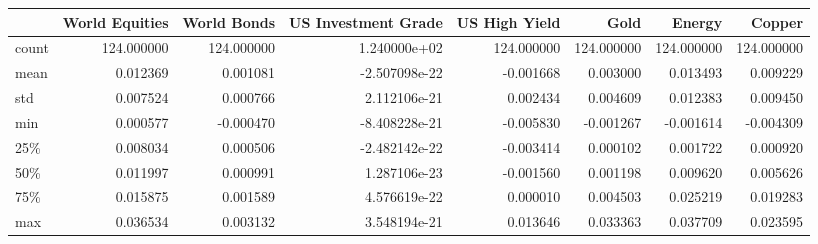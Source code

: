 \begin{tabular}{lrrrrrrr}
\toprule
{} &  World Equities &  World Bonds &  US Investment Grade &  US High Yield &        Gold &      Energy &      Copper \\
\midrule
count &      124.000000 &   124.000000 &         1.240000e+02 &     124.000000 &  124.000000 &  124.000000 &  124.000000 \\
mean  &        0.012369 &     0.001081 &        -2.507098e-22 &      -0.001668 &    0.003000 &    0.013493 &    0.009229 \\
std   &        0.007524 &     0.000766 &         2.112106e-21 &       0.002434 &    0.004609 &    0.012383 &    0.009450 \\
min   &        0.000577 &    -0.000470 &        -8.408228e-21 &      -0.005830 &   -0.001267 &   -0.001614 &   -0.004309 \\
25\%   &        0.008034 &     0.000506 &        -2.482142e-22 &      -0.003414 &    0.000102 &    0.001722 &    0.000920 \\
50\%   &        0.011997 &     0.000991 &         1.287106e-23 &      -0.001560 &    0.001198 &    0.009620 &    0.005626 \\
75\%   &        0.015875 &     0.001589 &         4.576619e-22 &       0.000010 &    0.004503 &    0.025219 &    0.019283 \\
max   &        0.036534 &     0.003132 &         3.548194e-21 &       0.013646 &    0.033363 &    0.037709 &    0.023595 \\
\bottomrule
\end{tabular}
